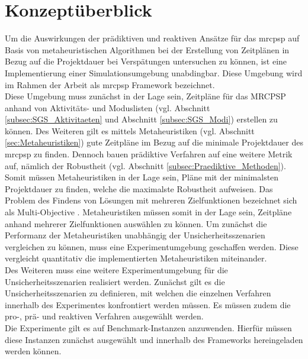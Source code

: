\section{Konzeptüberblick} \label{sec:Konzeptüberblick}

Um die Auswirkungen der prädiktiven und reaktiven Ansätze für das \ac{mrcpsp} auf Basis von metaheuristischen Algorithmen bei der Erstellung von Zeitplänen in Bezug auf die Projektdauer bei Verspätungen untersuchen zu können, ist eine Implementierung einer Simulationsumgebung unabdingbar. Diese Umgebung wird im Rahmen der Arbeit als \ac{mrcpsp} Framework bezeichnet. \\

Diese Umgebung muss zunächst in der Lage sein, Zeitpläne für das MRCPSP anhand von Aktivitäts- und Moduslisten (vgl. Abschnitt \ref{subsec:SGS_Aktivitaeten} und Abschnitt \ref{subsec:SGS_Modi}) erstellen zu können. Des Weiteren gilt es mittels Metaheuristiken (vgl. Abschnitt \ref{sec:Metaheuristiken}) gute Zeitpläne im Bezug auf die minimale Projektdauer des \ac{mrcpsp} zu finden. Dennoch bauen prädiktive Verfahren auf eine weitere Metrik auf, nämlich der Robustheit (vgl. Abschnitt \ref{subsec:Praediktive_Methoden}). Somit müssen Metaheuristiken in der Lage sein, Pläne mit der minimalsten Projektdauer zu finden, welche die maximalste Robustheit aufweisen. Das Problem des Findens von Lösungen mit mehreren Zielfunktionen bezeichnet sich als Multi-Objective \cite[vgl. ][S. 146 f.]{abbasi_bi-objective_2006}. Metaheuristiken müssen somit in der Lage sein, Zeitpläne anhand mehrerer Zielfunktionen auswählen zu können. Um zunächst die Performanz der Metaheuristiken unabhängig der Unsicherheitsszenarien vergleichen zu können, muss eine Experimentumgebung geschaffen werden. Diese vergleicht quantitativ die implementierten Metaheuristiken miteinander. \\

Des Weiteren muss eine weitere Experimentumgebung für die Unsicherheitsszenarien realisiert werden. Zunächst gilt es die Unsicherheitsszenarien zu definieren, mit welchen die einzelnen Verfahren innerhalb des Experimentes konfrontiert werden müssen. Es müssen zudem die pro-, prä- und reaktiven Verfahren ausgewählt werden. \\

Die Experimente gilt es auf Benchmark-Instanzen anzuwenden. Hierfür müssen diese Instanzen zunächst ausgewählt und innerhalb des Frameworks hereingeladen werden können.\\

